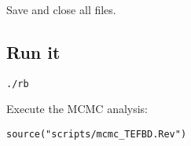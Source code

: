 {\begin{framed}
Save and close all files.
\end{framed}}

\bigskip
\subsection{Run it}\label{subsect:RB-RunMCMC}


{\tt \begin{snugshade*}
\begin{lstlisting}
./rb
\end{lstlisting}
\end{snugshade*}}

Execute the MCMC analysis:
{\tt \begin{snugshade*}
\begin{lstlisting}
source("scripts/mcmc_TEFBD.Rev")
\end{lstlisting}
\end{snugshade*}}

